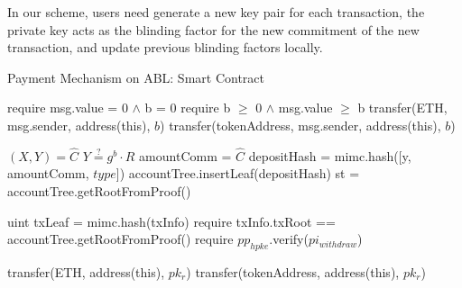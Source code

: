 \documentclass{article}
\begin{document}
In our scheme, users need generate a new key pair for each transaction, the private key acts as the blinding factor for the new commitment of the new transaction, and update previous blinding factors locally.


\begin{algorithm}
 \DontPrintSemicolon
 \LinesNumbered
 \caption{Payment Mechanism on ABL: Smart Contract}
  \begin{multicols}{2}
  

   {

     {
        require msg.value = 0 $\land$ b = 0 \;
    } {
     {
        require b $\ge$ 0 $\land$ msg.value $\ge$ b \;
        transfer(ETH, msg.sender, address(this), $b$)
    } {
        transfer(tokenAddress, msg.sender, address(this), $b$)
    }
    }
    
    $(X, Y) = \hat{C}$ \; 
    $Y \overset{?}{=} g^b \cdot R$ \;
    amountComm = $\hat{C}$ \;
    depositHash = mimc.hash([y, amountComm, $type$]) \;
    accountTree.insertLeaf(depositHash) \;
    st = accountTree.getRootFromProof()
  }
  
   {
    
    uint txLeaf = mimc.hash(txInfo) \;
    require txInfo.txRoot == accountTree.getRootFromProof() \;
    require $pp_{hpke}$.verify($pi_{withdraw}$) \;
    
     {
        transfer(ETH, address(this), $pk_r$)
    }{
        transfer(tokenAddress, address(this), $pk_r$)
    } 
  }
 
   {
    
}
\end{multicols}
\end{algorithm}
\end{document}
